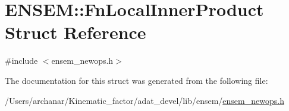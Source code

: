\hypertarget{structENSEM_1_1FnLocalInnerProduct}{}\section{E\+N\+S\+EM\+:\+:Fn\+Local\+Inner\+Product Struct Reference}
\label{structENSEM_1_1FnLocalInnerProduct}


{\ttfamily \#include $<$ensem\+\_\+newops.\+h$>$}



The documentation for this struct was generated from the following file\+:\begin{DoxyCompactItemize}
\item 
/\+Users/archanar/\+Kinematic\+\_\+factor/adat\+\_\+devel/lib/ensem/\mbox{\hyperlink{lib_2ensem_2ensem__newops_8h}{ensem\+\_\+newops.\+h}}\end{DoxyCompactItemize}
